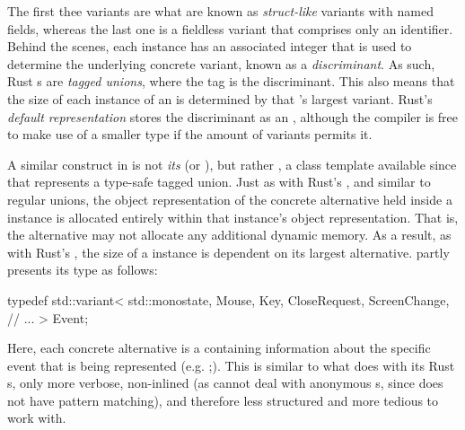 The first thee variants are what are known as \textit{struct-like} variants
with named fields, whereas the last one is a fieldless variant that comprises
only an identifier\cite{therustreference}. Behind the scenes, each 
instance has an associated integer that is used to determine the underlying
concrete variant, known as a \textit{discriminant}\cite{therustreference}.
As such, Rust s are \textit{tagged unions}, where the tag is the
discriminant. This also means that the size of each instance of an 
is determined by that 's largest variant. Rust's \textit{default
representation} stores the discriminant as an , although the
compiler is free to make use of a smaller type if the amount of variants permits
it\cite{therustreference}.



A similar construct in \cpp is not \textit{its}  (or ), but rather , a class template available since
 that represents a type-safe tagged union\cite{cppstd}. Just as with
Rust's , and similar to regular unions, the object representation
of the concrete alternative held inside a  instance is
allocated entirely within that instance's object representation\cite{cppstd}.
That is, the alternative may not allocate any additional dynamic
memory\cite{cppstd}. As a result, as with Rust's , the
size of a  instance is dependent on its largest
alternative\cite{cppstd}. \wmcpp partly presents its  type as
follows:

\begin{cppblock}
  typedef std::variant<
    std::monostate,
    Mouse,
    Key,
    CloseRequest,
    ScreenChange,
    // ...
  > Event;
\end{cppblock}

Here, each concrete alternative is a \cpp {} containing information
about the specific event that is being represented (e.g. 
;). This is similar to what \wmrs does with its
Rust s, only more verbose, non-inlined (as 
cannot deal with anonymous s, since \cpp does not have pattern
matching), and therefore less structured and more tedious to work with.


